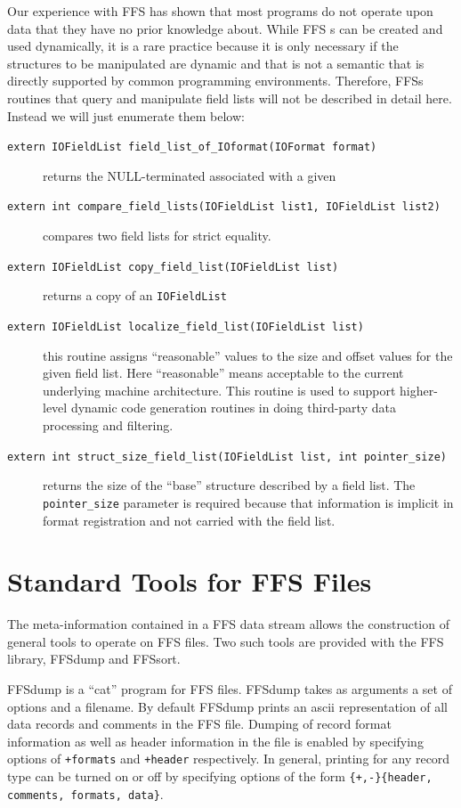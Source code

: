 {Our experience with FFS has shown that most programs do not operate upon
data that they have no prior knowledge about.  While FFS
s can be created and used dynamically, it is a rare
practice because it is only necessary if the structures to be manipulated
are dynamic and that is not a semantic that is directly supported by common
programming environments.  Therefore, FFSs routines that query and
manipulate field lists will not be described in detail here.  Instead we
will just enumerate them below:
\begin{description}
\item[{\tt extern IOFieldList field\_list\_of\_IOformat(IOFormat format)}]
returns the NULL-terminated  associated with a given
\item[{\tt extern int compare\_field\_lists(IOFieldList list1, IOFieldList
list2)}]
compares two field lists for strict equality.
\item[{\tt extern IOFieldList copy\_field\_list(IOFieldList list)}]
returns a copy of an {\tt IOFieldList}
\item[{\tt extern IOFieldList localize\_field\_list(IOFieldList list)}]
this routine assigns ``reasonable'' values to the size and offset values
for the given field list.  Here ``reasonable'' means acceptable to the
current underlying machine architecture.  This routine is used to support
higher-level dynamic code generation routines in doing third-party data
processing and filtering.
\item[{\tt extern int struct\_size\_field\_list(IOFieldList list, int pointer\_size)}]
returns the size of the ``base'' structure described by a field list.  The
{\tt pointer\_size} parameter is required because that information is
implicit in format registration and not carried with the field list.
\end{description}

\section{Standard Tools for FFS Files}
The meta-information contained in a FFS data stream allows the construction
of general tools to operate on FFS files.  Two such tools are provided with
the FFS library, FFSdump and FFSsort.

FFSdump is a ``cat'' program for FFS files.  FFSdump takes as arguments a set
of options and a filename.  By default FFSdump prints an ascii representation
of all data records and comments in the FFS file.  Dumping of record format
information as well as header information in the file is enabled by specifying
options of {\tt +formats} and {\tt +header} respectively.  In general,
printing for any record type can be turned on or off by specifying options
of the form {\tt \{+,-\}\{header, comments, formats, data\}}.

}
